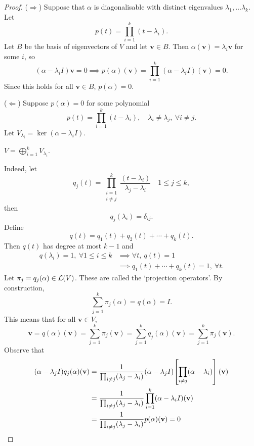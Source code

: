 \documentclass[a4paper]{article}
\begin{document}
\begin{proof}
	($ \Rightarrow $) Suppose that $\alpha$ is diagonalisable with distinct eigenvalues $ \lambda_1,\dots \lambda_k $. Let
	\[
		p(t)= \prod_{i=1}^k (t - \lambda_i). 
	\]
	Let $ B $ be the basis of eigenvectors of $V$ and let $ \mathbf{v}\in B $. Then $\alpha(\mathbf{v}) = \lambda_i \mathbf{v}$ for some $i$, so 
	\[
		(\alpha - \lambda_i I) \mathbf{v} = 0 \implies p(\alpha)(\mathbf{v}) = \prod_{i=1}^k (\alpha - \lambda_i I) (\mathbf{v}) = 0. 
	\]
	Since this holds for all $\mathbf{v}\in B$, $ p(\alpha) = 0. $

	($ \Leftarrow $) Suppose $ p(\alpha) = 0 $ for some polynomial 
	\[
		p(t) = \prod_{i=1}^k (t - \lambda_i), \quad \lambda_i\neq \lambda_j,\ \forall i\neq j. 
	\]
	Let $ V_{\lambda_i} = \ker(\alpha - \lambda_i I) $. 
	\begin{claim}
		$\displaystyle V = \bigoplus_{i=1}^{k} V_{\lambda_i}$. 
	\end{claim}
	Indeed, let 
	\[
		q_{j}(t) = \prod_{\substack{i = 1 \\ i\neq j}}^{k} \frac{(t-\lambda_i)}{\lambda_j-\lambda_i}\quad 1\le j\le k,
	\]
	then 
	\[
		q_j (\lambda_i) = \delta_{ij}. 
	\]
	Define 
	\[
		q(t) = q_{1}(t) + q_2(t) + \cdots + q_k(t). 
	\]
	Then $q(t)$ has degree at most $k-1$ and 
	\begin{align*}
		q(\lambda_i) = 1,\ \forall 1\le i\le k &\implies \forall t,\ q(t) = 1\\ 
		& \implies q_1(t)+\cdots + q_k(t) = 1, \ \forall t. 
	\end{align*}
	Let $ \pi_j = q_j ( \alpha)\in {\mathcal{L}}(V) $. These are called the `projection operators'. By construction, 
	\[
		\sum_{j=1}^{k} \pi_j(\alpha) = q(\alpha) = I. 
	\]
	This means that for all $ \mathbf{v}\in V $, 
	\[
		\mathbf{v} = q(\alpha) (\mathbf{v}) = \sum_{j=1}^{k} \pi_j(\mathbf{v}) = \sum_{j=1}^{k} q_j(\alpha)(\mathbf{v}) =\sum_{j=1}^{k} \pi_j(\mathbf{v}) . 
	\]
	Observe that 
	\begin{align*}
		(\alpha - \lambda_j I) q_j(\alpha)({\bf v}) & = \frac{1}{\prod_{i \neq j} (\lambda_j - \lambda_i)} (\alpha - \lambda_j I) \qty[\prod_{i \neq j} (\alpha - \lambda_i)] (\mathbf{v}) \\
		                                      & = \frac{1}{\prod_{i \neq j} (\lambda_j - \lambda_i)} \prod_{i=1}^k (\alpha - \lambda_i I)({\bf v})                                \\
		                                      & = \frac{1}{\prod_{i \neq j} (\lambda_j - \lambda_i)} p(\alpha)({\bf v}) = 0
	\end{align*}

\end{proof}
\end{document}
